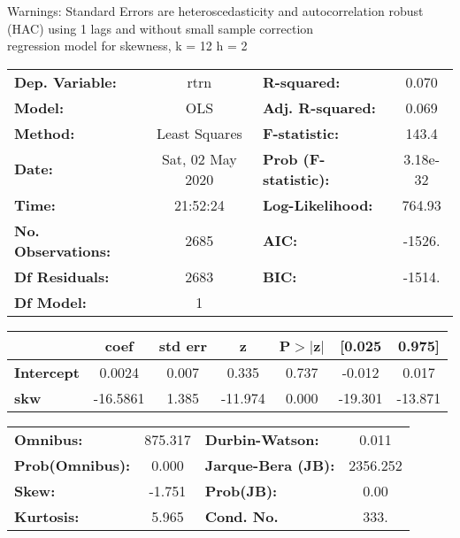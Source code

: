 Warnings: \newline
 [1] Standard Errors are heteroscedasticity and autocorrelation robust (HAC) using 1 lags and without small sample correction\\ 

regression model for skewness, k = 12 h = 2\begin{center}
\begin{tabular}{lclc}
\toprule
\textbf{Dep. Variable:}    &       rtrn       & \textbf{  R-squared:         } &     0.070   \\
\textbf{Model:}            &       OLS        & \textbf{  Adj. R-squared:    } &     0.069   \\
\textbf{Method:}           &  Least Squares   & \textbf{  F-statistic:       } &     143.4   \\
\textbf{Date:}             & Sat, 02 May 2020 & \textbf{  Prob (F-statistic):} &  3.18e-32   \\
\textbf{Time:}             &     21:52:24     & \textbf{  Log-Likelihood:    } &    764.93   \\
\textbf{No. Observations:} &        2685      & \textbf{  AIC:               } &    -1526.   \\
\textbf{Df Residuals:}     &        2683      & \textbf{  BIC:               } &    -1514.   \\
\textbf{Df Model:}         &           1      & \textbf{                     } &             \\
\bottomrule
\end{tabular}
\begin{tabular}{lcccccc}
                   & \textbf{coef} & \textbf{std err} & \textbf{z} & \textbf{P$> |$z$|$} & \textbf{[0.025} & \textbf{0.975]}  \\
\midrule
\textbf{Intercept} &       0.0024  &        0.007     &     0.335  &         0.737        &       -0.012    &        0.017     \\
\textbf{skw}       &     -16.5861  &        1.385     &   -11.974  &         0.000        &      -19.301    &      -13.871     \\
\bottomrule
\end{tabular}
\begin{tabular}{lclc}
\textbf{Omnibus:}       & 875.317 & \textbf{  Durbin-Watson:     } &    0.011  \\
\textbf{Prob(Omnibus):} &   0.000 & \textbf{  Jarque-Bera (JB):  } & 2356.252  \\
\textbf{Skew:}          &  -1.751 & \textbf{  Prob(JB):          } &     0.00  \\
\textbf{Kurtosis:}      &   5.965 & \textbf{  Cond. No.          } &     333.  \\
\bottomrule
\end{tabular}
\end{center}

